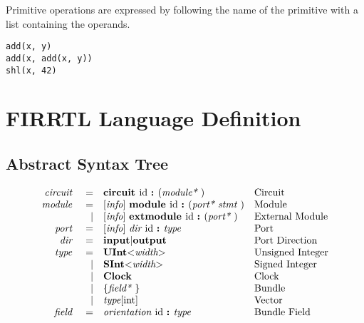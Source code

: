\documentclass[12pt]{article}
\begin{document}
Primitive operations are expressed by following the name of the primitive with a list containing the operands. 
\begin{verbatim}
add(x, y)
add(x, add(x, y))
shl(x, 42)
\end{verbatim}

\section{FIRRTL Language Definition}

\subsection{Abstract Syntax Tree}
{ \fontsize{10pt}{1.10em}\selectfont
\[
\begin{array}{rrll}
\text{\em circuit\ }    &=     &\text{\bf circuit\ } \text{id } \text{\bf :\ } (\text{\em module*\ })                                        &\text{Circuit}\\
\text{\em module\ }     &=     &[\text{\em info}]\  \text{\bf module\ }  \text{id } \text{\bf :\ } (\text{\em port*\ } \text{\em stmt\ })                          &\text{Module}\\
                &\vert &[\text{\em info}]\  \text{\bf extmodule\ }  \text{id } \text{\bf :\ } (\text{\em port*\ })                                 &\text{External Module}\\
\text{\em port\ }       &=     &[\text{\em info}]\  \text{\em dir\ } \text{id } \text{\bf :\ } \text{\em type\ }                                           &\text{Port}\\
\text{\em dir\ }        &=     &\text{\bf input} \vert \text{\bf output}                                                &\text{Port Direction}\\
\text{\em type\ }       &=     &\text{\bf UInt} \text{\bf $<$} \text{\em width} \text{\bf $>$}                                    &\text{Unsigned Integer}\\
                &\vert &\text{\bf SInt} \text{\bf $<$} \text{\em width} \text{\bf $>$}                                    &\text{Signed Integer}\\
                &\vert &\text{\bf Clock}                                                                   &\text{Clock}\\
                &\vert &\{\text{\em field*\ }\}                                                         &\text{Bundle}\\
                &\vert &\text{\em type}[\text{int}]                                                             &\text{Vector}\\
\text{\em field\ }      &=     &\text{\em orientation\ } \text{id } \text{\bf :\ } \text{\em type\ }                                         &\text{Bundle Field}\\

\end{array}\]}
\end{document}
